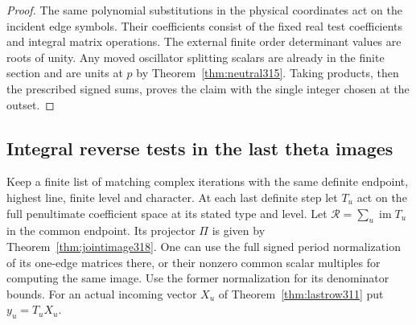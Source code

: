 \documentclass[a4paper,11pt]{article}
\theoremstyle{definition}
\theoremstyle{remark}
\numberwithin{equation}{section}
\begin{document}
\begin{proof}
The same polynomial substitutions in the physical coordinates
act on the incident edge symbols. Their coefficients consist of
the fixed real test coefficients and integral matrix operations.
The external finite order determinant values are roots of unity.
Any moved oscillator splitting scalars are already in the finite
section and are units at \(p\) by Theorem~\ref{thm:neutral315}.
Taking products, then the prescribed signed sums, proves the
claim with the single integer chosen at the outset.
\end{proof}

\subsection{Integral reverse tests in the last theta images}\label{nav:VIII-64}
Keep a finite list of matching complex iterations with the
same definite endpoint, highest line, finite level and character.
At each last definite step let \(T_u\) act on the full
penultimate coefficient space at its stated type and level.
Let \(\mathcal R=\sum_u\operatorname{im}T_u\) in the
common endpoint. Its projector \(\Pi\) is given by
Theorem~\ref{thm:jointimage318}. One can use the full
signed period normalization of its one-edge matrices
there, or their nonzero common scalar multiples for
computing the same image. Use the former normalization
for its denominator bounds. For an actual incoming
vector \(X_u\) of Theorem~\ref{thm:lastrow311} put
\(y_u=T_uX_u\).
\end{document}
